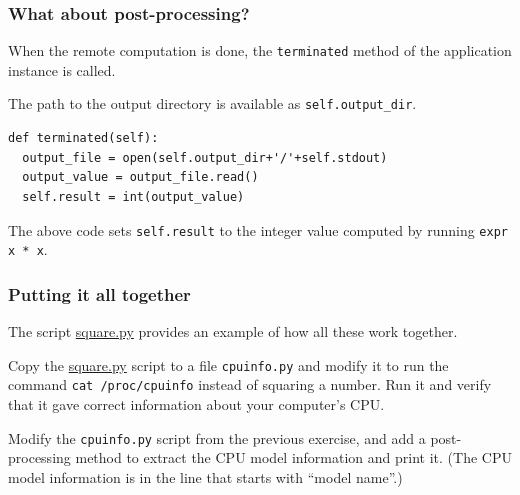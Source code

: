 \documentclass[english,serif,mathserif,xcolor=pdftex,dvipsnames,table]{beamer}
\begin{document}
\begin{frame}[fragile]
\frametitle{What about post-processing?}
\label{sec-11}

When the remote computation is done, the \texttt{terminated} method of
the application instance is called.

\+
The path to the output directory is available as \lstinline|self.output_dir|.

\+
\begin{lstlisting}
def terminated(self):
  output_file = open(self.output_dir+'/'+self.stdout)
  output_value = output_file.read()
  self.result = int(output_value)
\end{lstlisting}

\+
The above code sets \lstinline|self.result| to the integer value computed by
running \texttt{expr x * x}.
\end{frame}


\begin{frame}[fragile]
  \frametitle{Putting it all together}

  The script
  \href{https://github.com/uzh/gc3pie/blob/master/docs/programmers/tutorials/bottom-up/square.py}{square.py}
  provides an example of how all these work together.
\end{frame}


\begin{frame}
  \begin{exercise}
    Copy the
    \href{https://github.com/uzh/gc3pie/blob/master/docs/programmers/tutorials/bottom-up/square.py}{square.py}
    script to a file \texttt{cpuinfo.py} and modify it to run the
    command \texttt{cat /proc/cpuinfo} instead of squaring a number.
    Run it and verify that it gave correct information about your computer's CPU.
  \end{exercise}

  \+
  \begin{exercise}
    Modify the \texttt{cpuinfo.py} script from the previous exercise,
    and add a post-processing method to extract the CPU model
    information and print it.  (The CPU model information is in the
    line that starts with ``model name''.)
  \end{exercise}
\end{frame}
\end{document}

